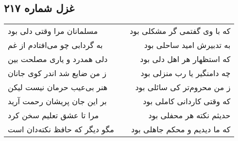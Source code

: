 \begin{center}
\section*{غزل شماره ۲۱۷}
\label{sec:sh217}
\begin{longtable}{l p{0.5cm} r}
مسلمانان مرا وقتی دلی بود
&&
که با وی گفتمی گر مشکلی بود
\\
به گردابی چو می‌افتادم از غم
&&
به تدبیرش امید ساحلی بود
\\
دلی همدرد و یاری مصلحت بین
&&
که استظهار هر اهل دلی بود
\\
ز من ضایع شد اندر کوی جانان
&&
چه دامنگیر یا رب منزلی بود
\\
هنر بی‌عیب حرمان نیست لیکن
&&
ز من محروم‌تر کی سائلی بود
\\
بر این جان پریشان رحمت آرید
&&
که وقتی کاردانی کاملی بود
\\
مرا تا عشق تعلیم سخن کرد
&&
حدیثم نکته هر محفلی بود
\\
مگو دیگر که حافظ نکته‌دان است
&&
که ما دیدیم و محکم جاهلی بود
\\
\end{longtable}
\end{center}
